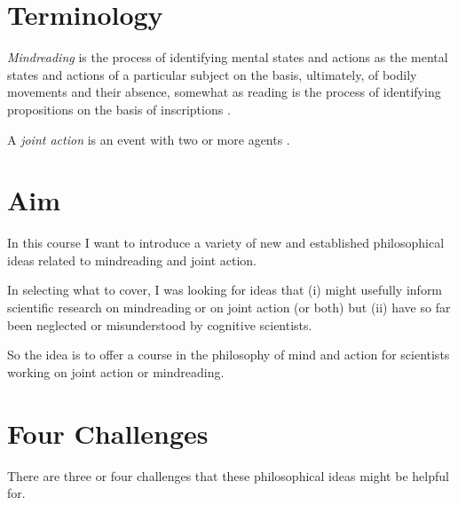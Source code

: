 \documentclass[12pt,\papersize]{extarticle}
\begin{document}
\setlength\footnotesep{1em}




\maketitle
%
%
%



\section{Terminology}


\textit{Mindreading} is 
	the process of 
	identifying mental states and actions 
	as the mental states and actions of a particular subject 
	on the basis, ultimately, of bodily movements and their absence,
somewhat as reading is the process of identifying propositions on the basis of inscriptions \citep[p.\ 4]{Apperly:2010kx}.


A \textit{joint action} is an event with two or more agents \citep{ludwig_collective_2007}.


\section{Aim}
In this course I want to introduce a variety of new and established philosophical ideas related to mindreading and joint action.

In selecting what to cover, I was looking for ideas that (i) might usefully inform scientific research on mindreading or on joint action (or both) but (ii) have so far been neglected or misunderstood by cognitive scientists.

So the idea is to offer a  course in the philosophy of mind and action for scientists working on joint action or mindreading.


\section{Four Challenges}
There are three or four challenges that these philosophical ideas might be helpful for.
\end{document}
